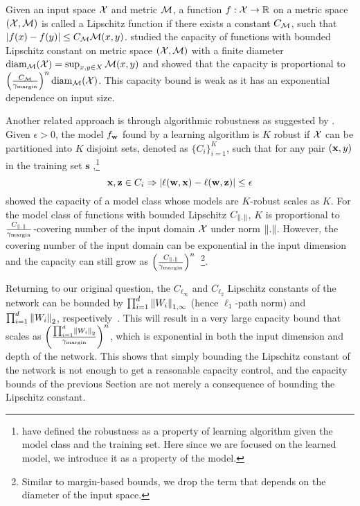 \documentclass{article}
\begin{document}
Given an input space $\mathcal{X}$ and metric $\mathcal{M}$, a function $f:\mathcal{X}\rightarrow \mathbb{R}$ on a metric space $(\mathcal{X},\mathcal{M})$ is called
a Lipschitz function if there exists a constant $C_{\mathcal{M}}$, such that $\left\lvert{f(x)-f(y)}\right\rvert\leq C_{\mathcal{M}} \mathcal{M}(x,y)$.
\citet{luxburg2004distance} studied the capacity of functions with
bounded Lipschitz constant on metric space $(\mathcal{X},\mathcal{M})$ with a finite diameter $\text{diam}_{\mathcal{M}}(\mathcal{X})=\sup_{x,y\in X} \mathcal{M}(x,y)$ 
and showed that the capacity is proportional to $\left(\frac{C_{\mathcal{M}}}{\gamma_{\text{margin}}}\right)^n \text{diam}_{\mathcal{M}}(\mathcal{X})$. This capacity bound is weak as it has an
exponential dependence on input size.

Another related approach is through algorithmic robustness as suggested by \citet{xu2012robustness}. Given $\epsilon>0$, the model $f_{\mathbf{w}}$ found by a learning algorithm is $K$ robust if $\mathcal{X}$ can be partitioned into $K$ disjoint sets, denoted as $\{C_i\}_{i=1}^K$, such that for any pair $(\mathbf{x},y)$ in the training set $\mathbf{s}$ ,\footnote{\citet{xu2012robustness} have defined the robustness as a property of learning algorithm given the model class and the training set. Here since we are focused on the learned model, we introduce it as a property of the model.}
\begin{equation}
\mathbf{x},\mathbf{z}\in C_i \Rightarrow \left\lvert{\ell(\mathbf{w},\mathbf{x})-\ell(\mathbf{w},\mathbf{z})}\right\rvert\leq \epsilon
\end{equation}
\citet{xu2012robustness} showed the capacity of a model class whose
models are $K$-robust scales as $K$. For the model class of functions
with bounded Lipschitz $C_{\left\lVert{.}\right\rVert}$, $K$ is proportional to
${\frac{C_{\left\lVert{.}\right\rVert}}{\gamma_{\text{margin}}}}$-covering number of the
input domain $\mathcal{X}$ under norm $\left\lVert{.}\right\rVert$. However, the covering
number of the input domain can be exponential in the input dimension
and the capacity can still grow as
$\left(\frac{C_{\left\lVert{.}\right\rVert}}{\gamma_{\text{margin}}}\right)^n$~\footnote{Similar to margin-based bounds, we drop the term that depends on the diameter of the input space.}.


Returning to our original question, the $C_{\ell_\infty}$ and $C_{\ell_2}$
Lipschitz constants of the network can be bounded by $\prod_{i=1}^d
\left\lVert{W_i}\right\rVert_{1,\infty}$ (hence $\ell_1$-path norm) and $\prod_{i=1}^d
\left\lVert{W_i}\right\rVert_{2}$,
respectively~\cite{xu2012robustness,sokolic2016generalization}. This
will result in a very large capacity bound that scales as
$\left(\frac{\prod_{i=1}^d \left\lVert{W_i}\right\rVert_{2}}{\gamma_{\text{margin}}}\right)^n$,
which is exponential in both the input dimension and depth of the
network. This shows that simply bounding the Lipschitz constant of the
network is not enough to get a reasonable capacity control, and the
capacity bounds of the previous Section are not merely a consequence
of bounding the Lipschitz constant.
\end{document}
